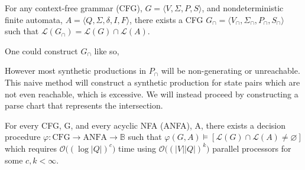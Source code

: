 \documentclass[sigplan,review,acmsmall,nonacm,screen,anonymous]{acmart}\settopmatter{printfolios=false,printccs=false,printacmref=false}
\begin{document}
  \begin{theorem}
    For any context-free grammar (CFG), $G = \langle V, \Sigma, P, S\rangle$, and nondeterministic finite automata, $A = \langle Q, \Sigma, \delta, I, F\rangle$, there exists a CFG \(G_\cap=\langle V_\cap, \Sigma_\cap, P_\cap, S_\cap\rangle\) such that $\mathcal{L}(G_\cap) = \mathcal{L}(G)\cap\mathcal{L}(A)$.
  \end{theorem}

  \begin{definition}[Salomaa, 1973]
    One could construct $G_\cap$ like so,

    \noindent{}
  \end{definition}

  However most synthetic productions in $P_\cap$ will be non-generating or unreachable. This naive method will construct a synthetic production for state pairs which are not even reachable, which is excessive. We will instead proceed by constructing a parse chart that represents the intersection.

  \begin{theorem}%
    For every CFG, G, and every acyclic NFA (ANFA), A, there exists a decision procedure $\varphi: \text{CFG} \rightarrow \text{ANFA} \rightarrow \mathbb{B}$ such that $\varphi(G, A) \models [\mathcal{L}(G)\cap\mathcal{L}(A) \neq \varnothing]$ which requires $\mathcal{O}\big((\log |Q|)^c\big)$ time using $\mathcal{O}\big((|V||Q|)^k\big)$ parallel processors for some $c, k < \infty$.
  \end{theorem}
\end{document}
